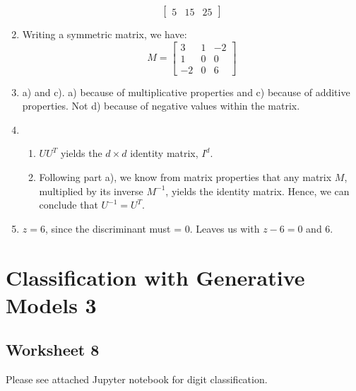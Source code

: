 \documentclass[12pt]{article}
\theoremstyle{plain}
\theoremstyle{definition}
\numberwithin{equation}{theorem}
\begin{document}
\begin{enumerate}
\[\begin{bmatrix}
    5 & 15 & 25
  \end{bmatrix}
\]
\addtocounter{enumi}{1}
\item Writing a symmetric matrix, we have:\\
	\[
M=
  \begin{bmatrix}
    3 & 1 & -2 \\
    1 & 0 & 0 \\
    -2 & 0 & 6
  \end{bmatrix}
\]
\item a) and c). a) because of multiplicative properties and c) because of additive properties. Not d) because of negative values within the matrix.
\addtocounter{enumi}{1}
\item
	\begin{enumerate}
	\item $UU^{T}$ yields the $d \times d$ identity matrix, $I^{d}$.
	\item Following part a), we know from matrix properties that any matrix $M$, multiplied by its inverse $M^{-1}$, yields the identity matrix. Hence, we can conclude that $U^{-1} = U^{T}$.
	\end{enumerate}
\item $z = 6$, since the discriminant must = 0. Leaves us with $z-6=0$ and 6.
\end{enumerate}
\bigskip

\section{Classification with Generative Models 3}
\subsection{Worksheet 8}
\bigskip
Please see attached Jupyter notebook for digit classification.
\end{document}
